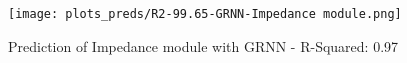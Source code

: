 
\begin{figure}[H]
    \centering
    \texttt{[image: plots\_preds/R2-99.65-GRNN-Impedance module.png]}
    \caption{Prediction of Impedance module with GRNN - R-Squared: 0.97}
\end{figure}

